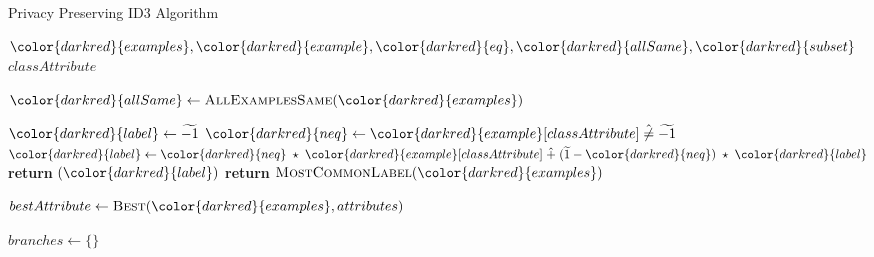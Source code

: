 \begin{algorithm}[H]
\caption{Privacy Preserving ID3 Algorithm}\label{a:id3-pp}
\begin{algorithmic}[1]
\renewcommand{\algorithmicrequire}{\textbf{Private Vars:}}
\Require ${\color{darkred}{examples}}, {\color{darkred}{example}}, {\color{darkred}{eq}}, {\color{darkred}{allSame}}, {\color{darkred}{subset}}$
\renewcommand{\algorithmicrequire}{\textbf{Global Vars:}}
\Require $classAttribute$

    \State ${\color{darkred}{allSame}} \gets \textsc{AllExamplesSame}({\color{darkred}{examples}})$

        \State ${\color{darkred}{label}} \gets \enc{-1}$
        \For{${\color{darkred}{example}} \in {\color{darkred}{examples}}$}
            \State ${\color{darkred}{neq}} \gets {\color{darkred}{example}}[classAttribute] \hneq \enc{-1}$
            \State ${\color{darkred}{label}} \gets {\color{darkred}{neq}} \hmul {\color{darkred}{example}}[classAttribute] \hplus (\enc{1} - {\color{darkred}{neq}}) \hmul {\color{darkred}{label}} $
        \EndFor
        \State \textbf{return} {{}}$({\color{darkred}{label}})$
        \State \textbf{return} $\textsc{MostCommonLabel}({\color{darkred}{examples}})$
    \EndIf

    \State $bestAttribute \gets \textsc{Best}({\color{darkred}{examples}}, attributes)$


    \State $branches \gets \{\}$


\end{algorithmic}
\end{algorithm}
